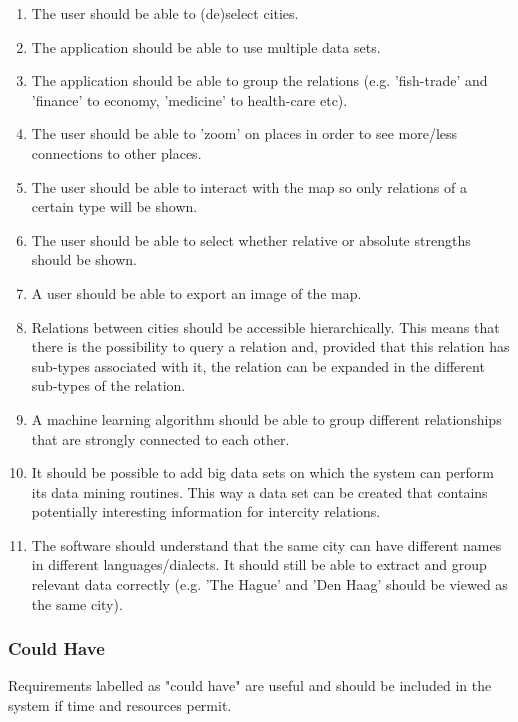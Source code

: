 \begin{enumerate}
    \item The user should be able to (de)select cities.
    \item The application should be able to use multiple data sets.
    \item The application should be able to group the relations (e.g. 'fish-trade' and 'finance' to economy, 'medicine' to health-care etc).
    \item The user should be able to 'zoom' on places in order to see more/less connections to other places.
    \item The user should be able to interact with the map so only relations of a certain type will be shown.
    \item The user should be able to select whether relative or absolute strengths should be shown.
    \item A user should be able to export an image of the map.
    \item Relations between cities should be accessible hierarchically. This means that there is the possibility to query a relation and, provided that this relation has sub-types associated with it, the relation can be expanded in the different sub-types of the relation.
    \item A machine learning algorithm should be able to group different relationships that are strongly connected to each other.
    \item It should be possible to add big data sets on which the system can perform its data mining routines. This way a data set can be created that contains potentially interesting information for intercity relations.
    \item The software should understand that the same city can have different names in different languages/dialects. It should still be able to extract and group relevant data correctly (e.g. 'The Hague' and 'Den Haag' should be viewed as the same city).
\end{enumerate}
\fi
\subsubsection {Could Have}
Requirements labelled as "could have" are useful and should be included in the system if time and resources permit.


